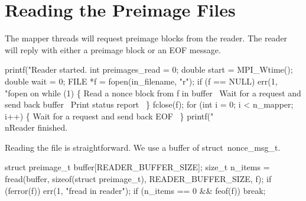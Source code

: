 \documentclass{article}%
\begin{document}
\nwendcode{}\nwdocspar

\section{Reading the Preimage Files}

The mapper threads will request preimage blocks from the reader. The reader
will reply with either a preimage block or an {\Tt{}EOF\nwendquote} message.

\nwenddocs{}\endmoddef\nwstartdeflinemarkup{}\nwenddeflinemarkup
printf("Reader started. %
int preimages_read = 0;
double start = MPI_Wtime();
double wait = 0;
FILE *f = fopen(in_filename, "r");
if (f == NULL)
        err(1, "fopen on %
while (1) \{
        \LA{}Read a nonce block from \code{}f\edoc{} in \code{}buffer\edoc{}~{\nwtagstyle{}}\RA{}
        \LA{}Wait for a request and send back \code{}buffer\edoc{}~{\nwtagstyle{}}\RA{}
        \LA{}Print status report~{\nwtagstyle{}}\RA{}
\}
fclose(f);
for (int i = 0; i < n_mapper; i++) \{
        \LA{}Wait for a request and send back \code{}EOF\edoc{}~{\nwtagstyle{}}\RA{}
\}
printf("\\nReader finished. %


\nwendcode{}Reading the file is straightforward. We use a buffer of {\Tt{}struct\ nonce{\_}msg{\_}t\nwendquote}.

\nwenddocs{}\endmoddef\nwstartdeflinemarkup{}\nwenddeflinemarkup
struct preimage_t buffer[READER_BUFFER_SIZE];
size_t n_items = fread(buffer, sizeof(struct preimage_t), READER_BUFFER_SIZE, f);
if (ferror(f))
        err(1, "fread in reader");
if (n_items == 0 && feof(f))
        break;
\end{document}
